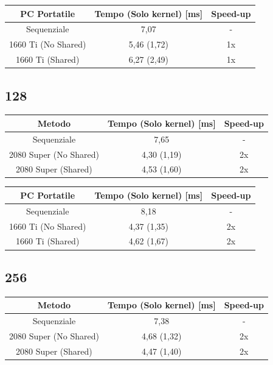 \documentclass[12pt,a4paper]{report}
\begin{document}
			\bigbreak
			
			\begin{tabular}{|c|c|c|}
				\hline
				PC Portatile & Tempo (Solo kernel) [ms] & Speed-up \\
				\hline
				Sequenziale & 7,07 & -  \\
				\hline
				1660 Ti (No Shared) & 5,46 (1,72) & 1x \\
				\hline
				1660 Ti (Shared) & 6,27 (2,49) & 1x \\
				\hline
			\end{tabular}

		\subsection{128}
		
			\begin{tabular}{|c|c|c|}
				\hline
				Metodo & Tempo (Solo kernel) [ms] & Speed-up \\
				\hline
				Sequenziale & 7,65 & -  \\
				\hline
				2080 Super (No Shared) & 4,30 (1,19) & 2x \\
				\hline
				2080 Super (Shared) & 4,53 (1,60) & 2x \\
				\hline
			\end{tabular}
			
			\bigbreak
			
			\begin{tabular}{|c|c|c|}
				\hline
				PC Portatile & Tempo (Solo kernel) [ms] & Speed-up \\
				\hline
				Sequenziale & 8,18 & -  \\
				\hline
				1660 Ti (No Shared) & 4,37 (1,35) & 2x \\
				\hline
				1660 Ti (Shared) & 4,62 (1,67) & 2x \\
				\hline
			\end{tabular}

		\subsection{256}
		
			\begin{tabular}{|c|c|c|}
				\hline
				Metodo & Tempo (Solo kernel) [ms] & Speed-up \\
				\hline
				Sequenziale & 7,38 & -  \\
				\hline
				2080 Super (No Shared) & 4,68 (1,32) & 2x \\
				\hline
				2080 Super (Shared) & 4,47 (1,40) & 2x \\
				\hline
			\end{tabular}
			
\end{document}
